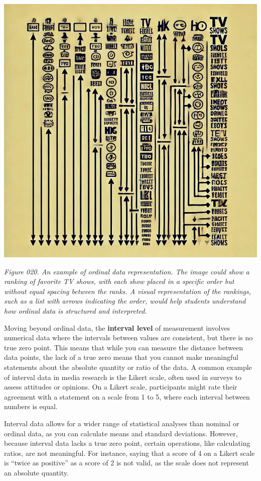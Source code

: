 \documentclass[
]{book}
\begin{document}
\includegraphics[width=1\linewidth,height=\textheight,keepaspectratio]{images/fig020.jpg}

\emph{Figure 020. An example of ordinal data representation. The image could show a ranking of favorite TV shows, with each show placed in a specific order but without equal spacing between the ranks. A visual representation of the rankings, such as a list with arrows indicating the order, would help students understand how ordinal data is structured and interpreted.}

Moving beyond ordinal data, the \textbf{interval level} of measurement involves numerical data where the intervals between values are consistent, but there is no true zero point. This means that while you can measure the distance between data points, the lack of a true zero means that you cannot make meaningful statements about the absolute quantity or ratio of the data. A common example of interval data in media research is the Likert scale, often used in surveys to assess attitudes or opinions. On a Likert scale, participants might rate their agreement with a statement on a scale from 1 to 5, where each interval between numbers is equal.

Interval data allows for a wider range of statistical analyses than nominal or ordinal data, as you can calculate means and standard deviations. However, because interval data lacks a true zero point, certain operations, like calculating ratios, are not meaningful. For instance, saying that a score of 4 on a Likert scale is ``twice as positive'' as a score of 2 is not valid, as the scale does not represent an absolute quantity.
\end{document}
